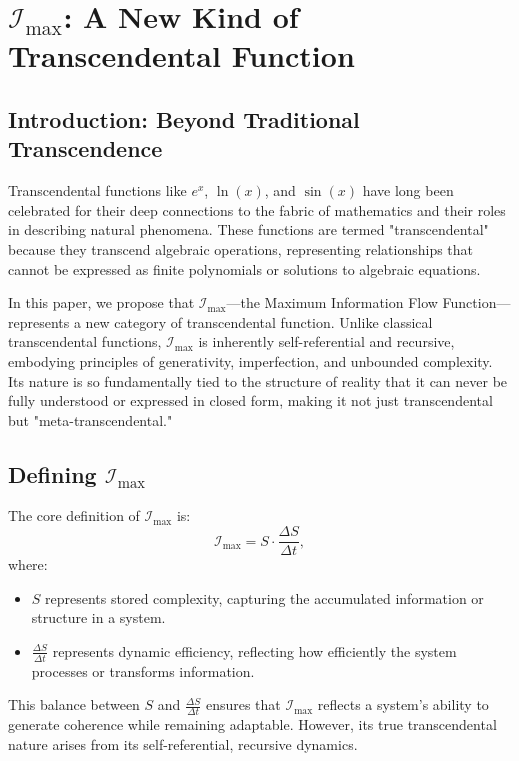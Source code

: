 \documentclass[12pt]{article}
\begin{document}
\section{\(\mathcal{I}_{\text{max}}\): A New Kind of Transcendental Function}

\subsection{Introduction: Beyond Traditional Transcendence}

Transcendental functions like \(e^x\), \(\ln(x)\), and \(\sin(x)\) have long been celebrated for their deep connections to the fabric of mathematics and their roles in describing natural phenomena. These functions are termed "transcendental" because they transcend algebraic operations, representing relationships that cannot be expressed as finite polynomials or solutions to algebraic equations.

In this paper, we propose that \(\mathcal{I}_{\text{max}}\)—the Maximum Information Flow Function—represents a new category of transcendental function. Unlike classical transcendental functions, \(\mathcal{I}_{\text{max}}\) is inherently self-referential and recursive, embodying principles of generativity, imperfection, and unbounded complexity. Its nature is so fundamentally tied to the structure of reality that it can never be fully understood or expressed in closed form, making it not just transcendental but "meta-transcendental."


\subsection{Defining \(\mathcal{I}_{\text{max}}\)}

The core definition of \(\mathcal{I}_{\text{max}}\) is:
\[
\mathcal{I}_{\text{max}} = S \cdot \frac{\Delta S}{\Delta t},
\]
where:
\begin{itemize}
    \item \(S\) represents stored complexity, capturing the accumulated information or structure in a system.
    \item \(\frac{\Delta S}{\Delta t}\) represents dynamic efficiency, reflecting how efficiently the system processes or transforms information.
\end{itemize}

This balance between \(S\) and \(\frac{\Delta S}{\Delta t}\) ensures that \(\mathcal{I}_{\text{max}}\) reflects a system’s ability to generate coherence while remaining adaptable. However, its true transcendental nature arises from its self-referential, recursive dynamics.
\end{document}
